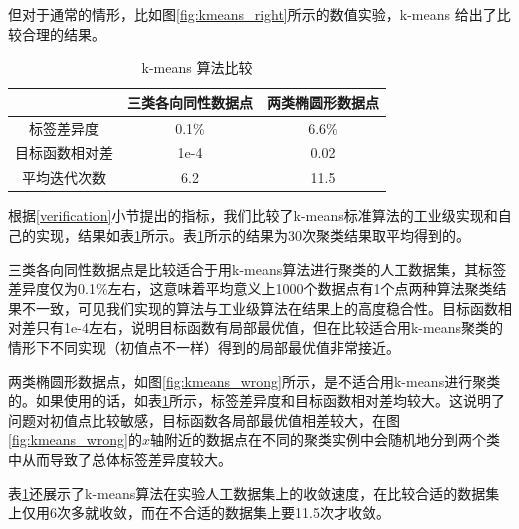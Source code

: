 \documentclass{ctexart}
\theoremstyle{definition}
\theoremstyle{remark}
\begin{document}
但对于通常的情形，比如图\ref{fig:kmeans_right}所示的数值实验，k-means 给出了比较合理的结果。

\begin{table}[!ht]
\centering
\begin{tabular}{ccc}
\hline
& 三类各向同性数据点 & 两类椭圆形数据点 \\
\hline
标签差异度 & 0.1\% & 6.6\% \\
目标函数相对差 & 1e-4 & 0.02 \\
平均迭代次数 & 6.2 & 11.5 \\
\hline
\end{tabular}
\caption{k-means 算法比较}\label{tb:compare}
\end{table}

根据\ref{verification}小节提出的指标，我们比较了k-means标准算法的工业级实现和自己的实现，结果如表\ref{tb:compare}所示。表\ref{tb:compare}所示的结果为30次聚类结果取平均得到的。

三类各向同性数据点是比较适合于用k-means算法进行聚类的人工数据集，其标签差异度仅为0.1\%左右，这意味着平均意义上1000个数据点有1个点两种算法聚类结果不一致，可见我们实现的算法与工业级算法在结果上的高度稳合性。目标函数相对差只有1e-4左右，说明目标函数有局部最优值，但在比较适合用k-means聚类的情形下不同实现（初值点不一样）得到的局部最优值非常接近。

两类椭圆形数据点，如图\ref{fig:kmeans_wrong}所示，是不适合用k-means进行聚类的。如果使用的话，如表\ref{tb:compare}所示，标签差异度和目标函数相对差均较大。这说明了问题对初值点比较敏感，目标函数各局部最优值相差较大，在图\ref{fig:kmeans_wrong}的$x$轴附近的数据点在不同的聚类实例中会随机地分到两个类中从而导致了总体标签差异度较大。

表\ref{tb:compare}还展示了k-means算法在实验人工数据集上的收敛速度，在比较合适的数据集上仅用6次多就收敛，而在不合适的数据集上要11.5次才收敛。
\end{document}
